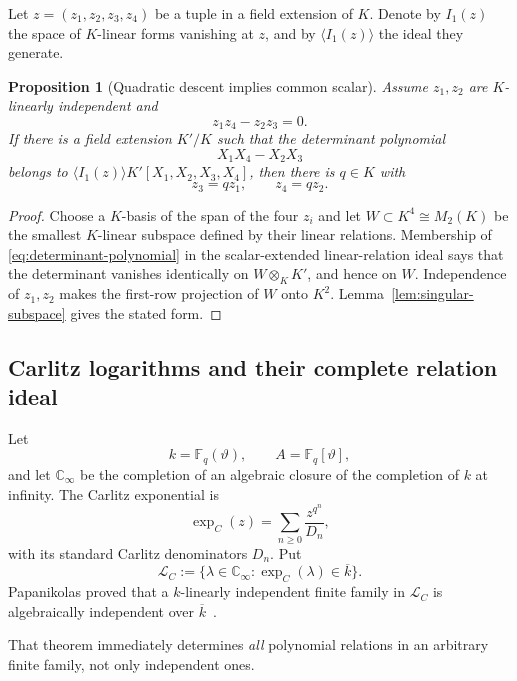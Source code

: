 \documentclass[11pt,oneside]{article}
\newtheorem{proposition}[theorem]{Proposition}
\theoremstyle{definition}
\theoremstyle{remark}
\newcommand{\C}{\mathbb C}
\newcommand{\Fq}{\mathbb F_q}
\newcommand{\cL}{\mathcal L}
\begin{document}
Let $z=(z_1,z_2,z_3,z_4)$ be a tuple in a field extension of $K$.  Denote by $I_1(z)$ the space of
$K$-linear forms vanishing at $z$, and by $\langle I_1(z)\rangle$ the ideal they generate.

\begin{proposition}[Quadratic descent implies common scalar]
\label{prop:quadratic-descent}
Assume $z_1,z_2$ are $K$-linearly independent and
\[
  z_1z_4-z_2z_3=0.
\]
If there is a field extension $K'/K$ such that the determinant polynomial
\begin{equation}
  X_1X_4-X_2X_3
  \label{eq:determinant-polynomial}
\end{equation}
belongs to $\langle I_1(z)\rangle K'[X_1,X_2,X_3,X_4]$, then there is $q\in K$ with
\[
  z_3=qz_1,
  \qquad z_4=qz_2.
\]
\end{proposition}

\begin{proof}
Choose a $K$-basis of the span of the four $z_i$ and let $W\subset K^4\cong M_2(K)$ be the
smallest $K$-linear subspace defined by their linear relations.  Membership of
\eqref{eq:determinant-polynomial} in the scalar-extended linear-relation ideal says that the
determinant vanishes identically on $W\otimes_K K'$, and hence on $W$.
Independence of $z_1,z_2$ makes the first-row projection of $W$ onto $K^2$.
Lemma~\ref{lem:singular-subspace} gives the stated form.
\end{proof}

\subsection{Carlitz logarithms and their complete relation ideal}

Let
\[
  k=\Fq(\vartheta),\qquad A=\Fq[\vartheta],
\]
and let $\C_\infty$ be the completion of an algebraic closure of the completion of $k$ at infinity.
The Carlitz exponential is
\[
  \exp_C(z)=\sum_{n\ge0}\frac{z^{q^n}}{D_n},
\]
with its standard Carlitz denominators $D_n$.  Put
\begin{equation}
  \cL_C:=\{\lambda\in\C_\infty:\exp_C(\lambda)\in\overline{k}\}.
  \label{eq:Carlitz-log-set}
\end{equation}
Papanikolas proved that a $k$-linearly independent finite family in $\cL_C$ is algebraically
independent over $\overline{k}$~\cite{Papanikolas2008}.

That theorem immediately determines \emph{all} polynomial relations in an arbitrary finite
family, not only independent ones.
\end{document}
